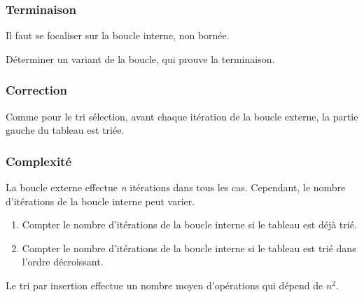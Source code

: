 \documentclass[a4paper,11pt]{article}
\begin{document}
\subsubsection{Terminaison}
Il faut se focaliser sur la boucle interne, non bornée.
\begin{activite}
Déterminer un variant de la boucle, qui prouve la terminaison.
\end{activite}
\subsubsection{Correction}
Comme pour le tri sélection, avant chaque itération de la boucle externe, la partie gauche du tableau est triée.
\subsubsection{Complexité}
La boucle externe effectue \emph{n} itérations dans tous les cas. Cependant, le nombre d'itérations de la boucle interne peut varier.
\begin{activite}
\begin{enumerate}
    \item Compter le nombre d'itérations de la boucle interne si le tableau est déjà trié.
    \item Compter le nombre d'itérations de la boucle interne si le tableau est trié dans l'ordre décroissant.
\end{enumerate}
\end{activite}
\begin{aretenir}[]
Le tri par insertion effectue un nombre moyen d'opérations qui dépend de $n^2$.
\end{aretenir}
\end{document}
